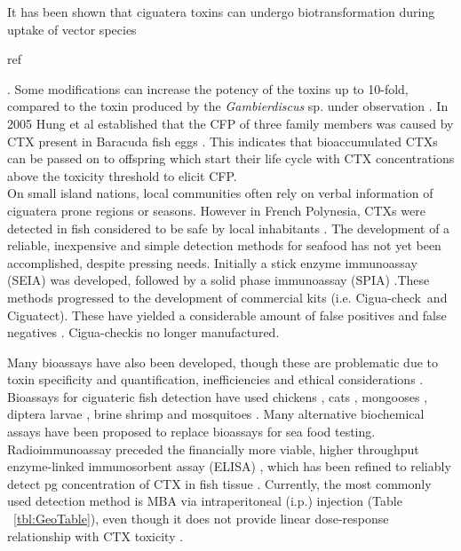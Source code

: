 \documentclass[12pt]{article}
\begin{document}
It has been shown that ciguatera toxins can undergo biotransformation during uptake of vector species \begin{LARGE}
ref
\end{LARGE}. %
Some modifications can increase the potency of the toxins up to 10-fold, compared to the toxin produced by the \emph{Gambierdiscus} sp. under observation \cite{lewis2006ciguatera}.
In 2005 Hung et al established that the CFP of three family members was caused by CTX present in Baracuda fish eggs \cite{hung2005persistent}. This indicates that bioaccumulated CTXs can be passed on to offspring which start their life cycle with CTX concentrations above the toxicity threshold to elicit CFP.  \\ %

On small island nations, local communities often rely on verbal information of ciguatera prone regions or seasons. However in French Polynesia, CTXs were detected in fish considered to be safe by local inhabitants  \cite{darius2007ciguatera}.
The development of a reliable, inexpensive and simple detection methods for seafood has not yet been accomplished, despite pressing needs. Initially a stick enzyme immunoassay (SEIA) \cite{hokama1985rapid} was developed, followed by a solid phase immunoassay (SPIA) \cite{hokama1990simplified}.These methods progressed to the development of commercial kits (i.e. Cigua-check\textregistered \ and Ciguatect\textregistered). These have yielded a considerable amount of false positives and false negatives \cite{wong2005study}. Cigua-check\textregistered is no longer manufactured.%

Many bioassays have also been developed, though these are problematic due to toxin specificity and quantification, inefficiencies and ethical considerations \cite{dickey2010ciguatera}.
Bioassays for ciguateric fish detection have used chickens \cite{vernoux1985chick}, cats \cite{larson1967ciguatera}, mongooses \cite{hokama1977radioimmunoassay}, diptera larvae \cite{labrousse1996toxicological}, brine shrimp \cite{granade1976ciguatera} and mosquitoes \cite{bagnis1987use}.
Many alternative biochemical assays have been proposed to replace bioassays for sea food testing. Radioimmunoassay \cite{hokama1977radioimmunoassay} preceded the financially more viable, higher throughput enzyme-linked immunosorbent assay (ELISA) \cite{hokama1983rapid}, which has been refined to reliably detect pg concentration of CTX in fish tissue \cite{campora2008detection,campora2010evaluating}. Currently, the most commonly used detection method is MBA via intraperitoneal (i.p.) injection (Table ~\ref{tbl:GeoTable}), even though it does not provide linear dose-response relationship with CTX toxicity \cite{hoffman1983mouse}. 
\end{document}
